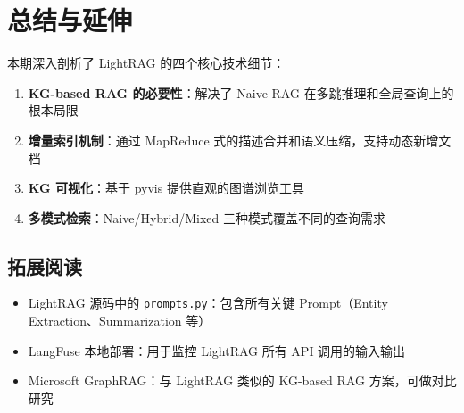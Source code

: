 \documentclass[a4paper]{article}
\begin{document}
\section{总结与延伸}

本期深入剖析了 LightRAG 的四个核心技术细节：

\begin{enumerate}
    \item \textbf{KG-based RAG 的必要性}：解决了 Naive RAG 在多跳推理和全局查询上的根本局限
    \item \textbf{增量索引机制}：通过 MapReduce 式的描述合并和语义压缩，支持动态新增文档
    \item \textbf{KG 可视化}：基于 pyvis 提供直观的图谱浏览工具
    \item \textbf{多模式检索}：Naive/Hybrid/Mixed 三种模式覆盖不同的查询需求
\end{enumerate}

\subsection{拓展阅读}

\begin{itemize}
    \item LightRAG 源码中的 \texttt{prompts.py}：包含所有关键 Prompt（Entity Extraction、Summarization 等）
    \item LangFuse 本地部署：用于监控 LightRAG 所有 API 调用的输入输出
    \item Microsoft GraphRAG：与 LightRAG 类似的 KG-based RAG 方案，可做对比研究
\end{itemize}

\end{document}
